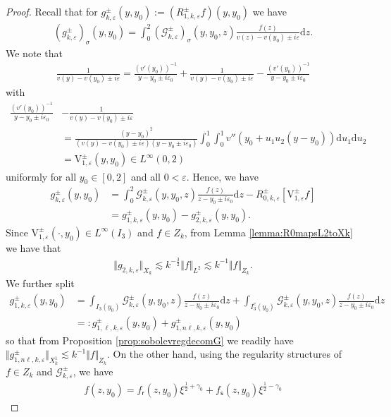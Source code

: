 \documentclass[11pt,reqno]{amsproc}
\theoremstyle{definition}
\numberwithin{equation}{section}
\newcommand{\G}{{\mathcal{G}}}
\newcommand{\sr}{{\mathsf{r}}}
\newcommand{\s}{{\mathsf{s}}}
\newcommand{\uv}{{0}}
\newcommand{\ov}{{2}}
\renewcommand{\d}{\mathrm{d}}
\newcommand{\ep}{\varepsilon}
\begin{document}
\begin{proof}
Recall that for $g_{k,\ep}^\pm(y,y_0):= (R_{1,k,\ep}^\pm f)(y,y_0)$ we have
\begin{align*}
\left( g_{k,\ep}^\pm \right)_{\sigma}(y,y_0) = \int_\uv ^ \ov \left( \G_{k,\ep}^\pm\right)_\sigma(y,y_0,z) \frac{f(z)}{v(z)-v(y_0)\pm i\ep} \d z. 
\end{align*}
We note that
\begin{align*}
\frac{1}{v(y) - v(y_0) \pm i\ep} = \frac{(v'(y_0))^{-1}}{y-y_0\pm i\ep_0} + \frac{1}{v(y) - v(y_0) \pm i\ep} - \frac{(v'(y_0))^{-1}}{y-y_0\pm i\ep_0} 
\end{align*}
with
\begin{align*}
\frac{(v'(y_0))^{-1}}{y-y_0\pm i\ep_0}  &- \frac{1}{v(y) - v(y_0) \pm i\ep} \\
&= \frac{(y-y_0)^2}{(v(y)-v(y_0)\pm i\ep)(y-y_0\pm i\ep_0)}\int_0^1\int_0^1 v''(y_0 + u_1 u_2(y-y_0)) \d u_1 \d u_2 \\
&=\mathrm{V}_{1,\ep}^\pm(y,y_0)\in L^\infty(0,2)
\end{align*}
uniformly for all $y_0\in [0,2]$ and all $0<\ep$. Hence, we have
\begin{align*}
g_{k,\ep}^\pm(y,y_0) &= \int_0^2 \G_{k,\ep}^\pm(y,y_0,z) \frac{f(z)}{z-y_0\pm i\ep_0}\d z - R_{0,k,\ep}^\pm\left[ \mathrm{V}_{1,\ep}^\pm f \right] \\
&=g_{1,k,\ep}^\pm(y,y_0) - g_{2,k,\ep}^\pm(y,y_0).
\end{align*}
Since $\mathrm{V}_{1,\ep}^\pm(\cdot,y_0)\in L^\infty(I_3)$ and $f\in Z_k$, from Lemma \ref{lemma:R0mapsL2toXk} we have that 
\begin{align*}
\Vert g_{2,k,\ep}\Vert_{X_k}\lesssim k^{-\frac32}\Vert f \Vert_{L^2}\lesssim k^{-1}\Vert f \Vert_{Z_k}.
\end{align*}
We further split
\begin{align*}
g_{1,k,\ep}^\pm(y,y_0) &= \int_{I_3(y_0)} \G_{k,\ep}^\pm(y,y_0,z) \frac{f(z)}{z-y_0\pm i\ep_0}\d z + \int_{I_3^c(y_0)} \G_{k,\ep}^\pm(y,y_0,z) \frac{f(z)}{z-y_0\pm i\ep_0}\d z \\
&=: g_{1,\ell,k,\ep}^\pm(y,y_0) + g_{1,n\ell,k,\ep}^\pm(y,y_0)
\end{align*}
so that from Proposition \ref{prop:sobolevregdecomG} we readily have $\Vert g_{1,n\ell,k,\ep}^\pm \Vert_{X_k^1}\lesssim k^{-1}\Vert f \Vert_{Z_k}$. On the other hand, using the regularity structures of $f\in Z_k$ and $\G_{k,\ep}^\pm$, we have
\begin{align*}
f(z,y_0) = f_\sr(z,y_0)\xi^{\frac12+\gamma_0} + f_\s(z,y_0) \xi^{\frac12-\gamma_0}

\end{align*}
\end{proof}
\end{document}
